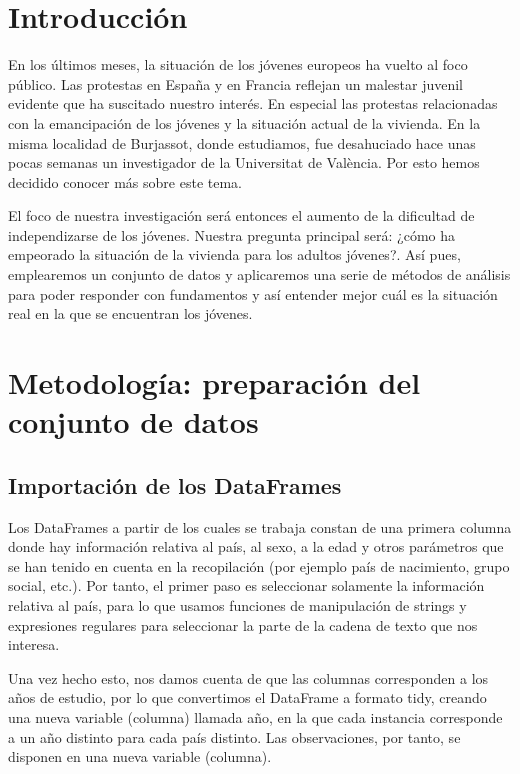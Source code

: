 \documentclass[water,article,submit,pdftex,moreauthors]{Definitions/mdpi}
\begin{document}
\section{Introducción}\label{introducciuxf3n}

En los últimos meses, la situación de los jóvenes europeos ha vuelto al
foco público. Las protestas en España y en Francia reflejan un malestar
juvenil evidente que ha suscitado nuestro interés. En especial las
protestas relacionadas con la emancipación de los jóvenes y la situación
actual de la vivienda. En la misma localidad de Burjassot, donde
estudiamos, fue desahuciado hace unas pocas semanas un investigador de
la Universitat de València. Por esto hemos decidido conocer más sobre
este tema.

El foco de nuestra investigación será entonces el aumento de la
dificultad de independizarse de los jóvenes. Nuestra pregunta principal
será: ¿cómo ha empeorado la situación de la vivienda para los adultos
jóvenes?. Así pues, emplearemos un conjunto de datos y aplicaremos una
serie de métodos de análisis para poder responder con fundamentos y así
entender mejor cuál es la situación real en la que se encuentran los
jóvenes.

\section{Metodología: preparación del conjunto de
datos}\label{metodologuxeda-preparaciuxf3n-del-conjunto-de-datos}

\subsection{Importación de los
DataFrames}\label{importaciuxf3n-de-los-dataframes}

Los DataFrames a partir de los cuales se trabaja constan de una primera
columna donde hay información relativa al país, al sexo, a la edad y
otros parámetros que se han tenido en cuenta en la recopilación (por
ejemplo país de nacimiento, grupo social, etc.). Por tanto, el primer
paso es seleccionar solamente la información relativa al país, para lo
que usamos funciones de manipulación de strings y expresiones regulares
para seleccionar la parte de la cadena de texto que nos interesa.

Una vez hecho esto, nos damos cuenta de que las columnas corresponden a
los años de estudio, por lo que convertimos el DataFrame a formato tidy,
creando una nueva variable (columna) llamada año, en la que cada
instancia corresponde a un año distinto para cada país distinto. Las
observaciones, por tanto, se disponen en una nueva variable (columna).
\end{document}
